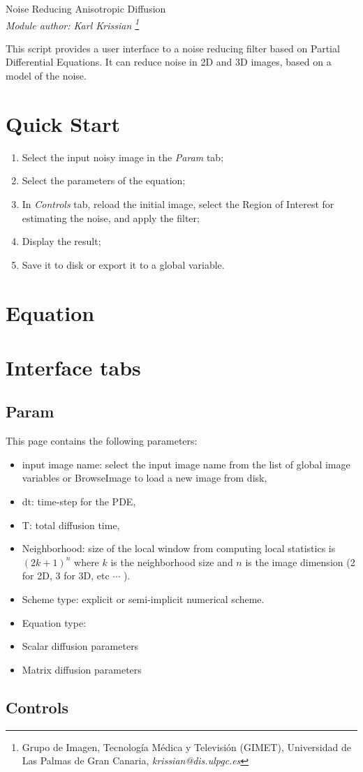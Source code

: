 \documentclass[11pt,a6paper]{report}
\begin{document}
\begin{center}
 { \Large Noise Reducing Anisotropic Diffusion }\\
 \it{ Module author:} Karl Krissian 
\footnote{
Grupo de Imagen, Tecnolog\'ia M\'edica y Televisi\'on (GIMET),
Universidad de Las Palmas de Gran Canaria, {\it krissian@dis.ulpgc.es}
}
\end{center}

This script provides a user interface to a noise reducing filter based on Partial Differential Equations. It can reduce noise in 2D and 3D images, based on a model of the noise.

\section{Quick Start}

\begin{enumerate}
 \item Select the input noisy image in the {\it Param}  tab;
 \item Select the parameters of the equation;
 \item In {\it Controls}  tab, reload the initial image, select the Region of Interest for estimating the noise, and apply the filter;
 \item Display the result;
 \item Save it to disk or export it to a global variable.
\end{enumerate}

\section{Equation}

\section{Interface tabs}

\subsection{Param} \label{sec:Param}

This page contains the following parameters:
\begin{itemize}
 \item input image name: select the input image name from the list of global image variables or BrowseImage to load a new image from disk,
 \item dt: time-step for the PDE,
 \item T: total diffusion time,
 \item Neighborhood: size of the local window from computing local statistics is ${(2k+1)}^n$ where $k$ is the neighborhood size and $n$ is the image dimension (2 for 2D, 3 for 3D, etc $\cdots$ ).
 \item Scheme type: explicit or semi-implicit numerical scheme.
 \item Equation type: 
 \item Scalar diffusion parameters
 \item Matrix diffusion parameters
\end{itemize}


\subsection{Controls} \label{sec:Controls}



\end{document}
